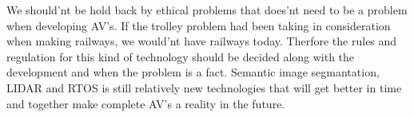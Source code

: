 \documentclass[conference]{IEEEtran}
\begin{document}
	We should'nt be hold back by ethical problems that does'nt need to be a problem when developing AV's. If the trolley problem had been taking in consideration when making 
	railways, we would'nt have railways today. Therfore the rules and regulation for this kind of technology should be decided along with the development and when the problem is a fact.
	Semantic image segmantation, LIDAR and RTOS is still relatively new technologies that will get better in time and together make complete AV's a reality in the future.





\end{document}

